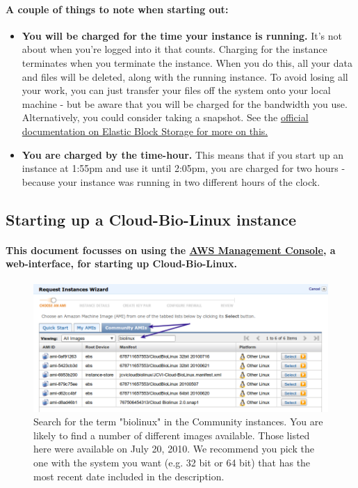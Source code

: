 \paragraph{A couple of things to note when starting out:}
\begin{itemize}
\item \textbf{You will be charged for the time your instance is running.} It's not about when you're logged into it that counts. Charging for the instance terminates when you terminate the instance. When you do this, all your data and files will be deleted, along with the running instance. To avoid losing all your work, you can just transfer your files off the system onto your local machine - but be aware that you will be charged for the bandwidth you use. Alternatively, you could consider taking a snapshot. See the \href{http://aws.amazon.com/ebs/}{official documentation on Elastic Block Storage for more on this.} 
\item \textbf{You are charged by the time-hour.} This means that if you start up an instance at 1:55pm and use it until 2:05pm, you are charged for two hours - because your instance was running in two different hours of the clock. 

\end{itemize}

\subsection{Starting up a Cloud-Bio-Linux instance}
\paragraph{This document focusses on using the \href{http://console.aws.amazon.com/ec2/home}{AWS Management Console}, a web-interface, for starting up Cloud-Bio-Linux.}

\begin{figure}[!hd]
\includegraphics[width=\maxwidth]{"images/requestInstance"}
\caption[Start an Instance]{\label{fig:requestInstance}Search for the term "biolinux" in the Community instances. You are likely to find a number of different images available. Those listed here were available on July 20, 2010. We recommend you pick the one with the system you want (e.g. 32 bit or 64 bit) that has the most recent date included in the description.}
\end{figure}

